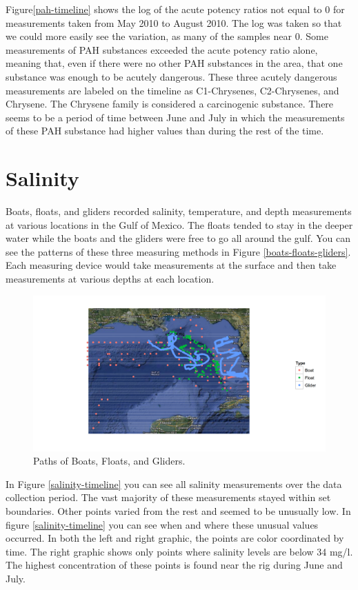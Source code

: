 \documentclass[11pt]{article}
\begin{document}
Figure\ref {pah-timeline} shows the log of the acute potency ratios not equal to 0 for measurements taken from May 2010 to August 2010. The log was taken so that we could more easily see the variation, as many of the samples near 0. Some measurements of PAH substances exceeded the acute potency ratio alone, meaning that, even if there were no other PAH substances in the area, that one substance was enough to be acutely dangerous.  These three acutely dangerous measurements are labeled on the timeline as C1-Chrysenes, C2-Chrysenes, and Chrysene.  The Chrysene family is considered a carcinogenic substance.  There seems to be a period of time between June and July in which the measurements of these PAH substance had higher values than during the rest of the time.    

\section{Salinity}
Boats, floats, and gliders recorded salinity, temperature, and depth measurements at various locations in the Gulf of Mexico. The floats tended to stay in the deeper water while the boats and the gliders were free to go all around the gulf.  You can see the patterns of these three measuring methods in Figure \ref {boats-floats-gliders}. Each measuring device would take measurements at the surface and then take measurements at various depths at each location.  

\begin{figure}[htbp] %
   \centering
   \includegraphics[width=5in]{boats-floats-gliders.png} 
   \caption{Paths of Boats, Floats, and Gliders. }
   \label{Boats, Floats and Gliders}
\end{figure}

In Figure \ref {salinity-timeline} you can see all salinity measurements over the data collection period. The vast majority of these measurements stayed within set boundaries.  Other points varied from the rest and seemed to be unusually low. In figure \ref {salinity-timeline} you can see when and where these unusual values occurred. In both the left and right graphic, the points are color coordinated by time. The right graphic shows only points where salinity levels are below 34 mg/l. The highest concentration of these points is found near the rig during June and July.  
\end{document}
